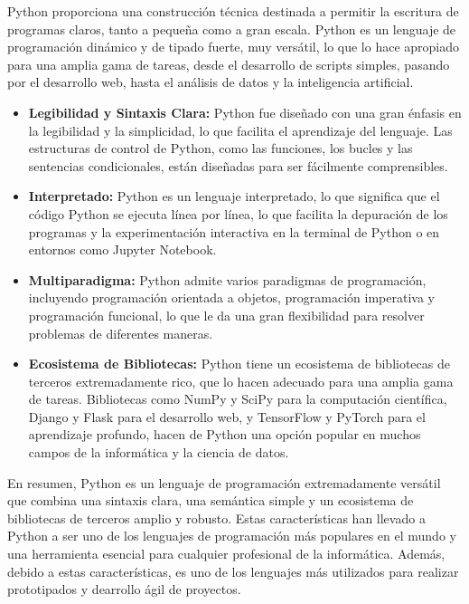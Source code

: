 Python proporciona una construcción técnica destinada a permitir la escritura de programas claros, tanto a pequeña como a gran escala. Python es un lenguaje de programación dinámico y de tipado fuerte, muy versátil, lo que lo hace apropiado para una amplia gama de tareas, desde el desarrollo de scripts simples, pasando por el desarrollo web, hasta el análisis de datos y la inteligencia artificial.

\begin{itemize}

    \item \textbf{Legibilidad y Sintaxis Clara:} Python fue diseñado con una gran énfasis en la legibilidad y la simplicidad, lo que facilita el aprendizaje del lenguaje. Las estructuras de control de Python, como las funciones, los bucles y las sentencias condicionales, están diseñadas para ser fácilmente comprensibles.
    
    \item \textbf{Interpretado:} Python es un lenguaje interpretado, lo que significa que el código Python se ejecuta línea por línea, lo que facilita la depuración de los programas y la experimentación interactiva en la terminal de Python o en entornos como Jupyter Notebook.
    
    \item \textbf{Multiparadigma:} Python admite varios paradigmas de programación, incluyendo programación orientada a objetos, programación imperativa y programación funcional, lo que le da una gran flexibilidad para resolver problemas de diferentes maneras.
    
    \item \textbf{Ecosistema de Bibliotecas:} Python tiene un ecosistema de bibliotecas de terceros extremadamente rico, que lo hacen adecuado para una amplia gama de tareas. Bibliotecas como NumPy y SciPy para la computación científica, Django y Flask para el desarrollo web, y TensorFlow y PyTorch para el aprendizaje profundo, hacen de Python una opción popular en muchos campos de la informática y la ciencia de datos.
    
\end{itemize}

En resumen, Python es un lenguaje de programación extremadamente versátil que combina una sintaxis clara, una semántica simple y un ecosistema de bibliotecas de terceros amplio y robusto. Estas características han llevado a Python a ser uno de los lenguajes de programación más populares en el mundo y una herramienta esencial para cualquier profesional de la informática. Además, debido a estas características, es uno de los lenguajes más utilizados para realizar prototipados y dearrollo ágil de proyectos.

